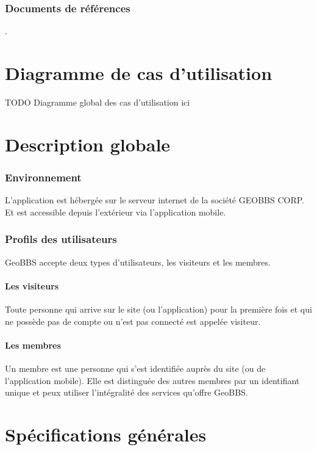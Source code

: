 \documentclass[a4paper,12pt]{report}
\begin{document}
\begin{onehalfspace}
\subsection{Documents de références} %
\label{ssub:documents_de_r_f_rences}
.

\chapter{Diagramme de cas d’utilisation}
TODO Diagramme global des cas d'utilisation ici


\chapter{Description globale}

\subsection{Environnement} %
\label{sub:environnement}
L’application est hébergée sur le serveur internet de la société GEOBBS CORP. Et est accessible depuis l’extérieur via l'application mobile.


\subsection{Profils des utilisateurs} %
\label{sub:profils_des_utilisateurs}

GeoBBS accepte deux types d’utilisateurs, les visiteurs et les membres.

\subsubsection{Les visiteurs}
Toute personne qui arrive sur le site (ou l'application) pour la première fois et qui ne possède pas de compte ou n’est pas connecté est appelée visiteur.

\subsubsection{Les membres}
Un membre est une personne qui s’est identifiée auprès du site (ou de l'application mobile). Elle est distinguée des autres membres par un identifiant unique et peux utiliser l’intégralité des services qu’offre GeoBBS.


\chapter{Spécifications générales} %
\label{cha:sp_cifications_g_n_rales}


\end{onehalfspace}
\end{document}
